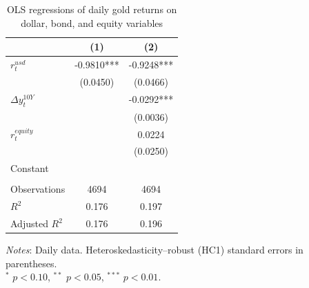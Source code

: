 \begin{table}[H]
\centering
\caption{OLS regressions of daily gold returns on dollar, bond, and equity variables}
\label{tab:ols_gold_dollar}
\begin{tabular}{lcc}
\toprule
 & (1) & (2) \\
\midrule
$r^{usd}_t$ & -0.9810*** & -0.9248*** \\
 & (0.0450) & (0.0466) \\
$\Delta y^{10Y}_t$ &  & -0.0292*** \\
 &  & (0.0036) \\
$r^{equity}_t$ &  & 0.0224 \\
 &  & (0.0250) \\
Constant &  &  \\
 &  &  \\
Observations & 4694 & 4694 \\
$R^2$ & 0.176 & 0.197 \\
Adjusted $R^2$ & 0.176 & 0.196 \\
\bottomrule
\end{tabular}

\vspace{0.2cm}
\begin{minipage}{0.9\textwidth}
\footnotesize
\textit{Notes}: Daily data. Heteroskedasticity--robust (HC1) standard errors in parentheses.\\
$^*$ $p<0.10$, $^{**}$ $p<0.05$, $^{***}$ $p<0.01$.
\end{minipage}
\end{table}
